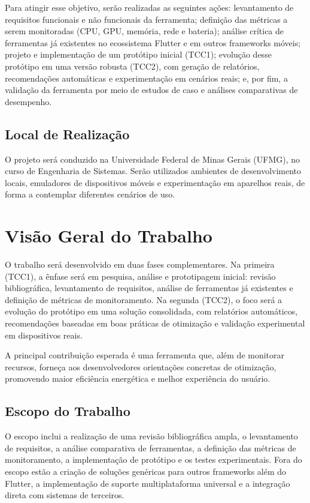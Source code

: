 \documentclass[12pt,a4paper]{article}
\begin{document}
Para atingir esse objetivo, serão realizadas as seguintes ações: levantamento de requisitos funcionais e não funcionais da ferramenta; definição das métricas a serem monitoradas (CPU, GPU, memória, rede e bateria); análise crítica de ferramentas já existentes no ecossistema Flutter e em outros frameworks móveis; projeto e implementação de um protótipo inicial (TCC1); evolução desse protótipo em uma versão robusta (TCC2), com geração de relatórios, recomendações automáticas e experimentação em cenários reais; e, por fim, a validação da ferramenta por meio de estudos de caso e análises comparativas de desempenho.

\subsection{Local de Realização}
O projeto será conduzido na Universidade Federal de Minas Gerais (UFMG), no curso de Engenharia de Sistemas. Serão utilizados ambientes de desenvolvimento locais, emuladores de dispositivos móveis e experimentação em aparelhos reais, de forma a contemplar diferentes cenários de uso.

\section{Visão Geral do Trabalho}

O trabalho será desenvolvido em duas fases complementares. Na primeira (TCC1), a ênfase será em pesquisa, análise e prototipagem inicial: revisão bibliográfica, levantamento de requisitos, análise de ferramentas já existentes e definição de métricas de monitoramento. Na segunda (TCC2), o foco será a evolução do protótipo em uma solução consolidada, com relatórios automáticos, recomendações baseadas em boas práticas de otimização e validação experimental em dispositivos reais.  

A principal contribuição esperada é uma ferramenta que, além de monitorar recursos, forneça aos desenvolvedores orientações concretas de otimização, promovendo maior eficiência energética e melhor experiência do usuário.

\subsection{Escopo do Trabalho}
O escopo inclui a realização de uma revisão bibliográfica ampla, o levantamento de requisitos, a análise comparativa de ferramentas, a definição das métricas de monitoramento, a implementação de protótipo e os testes experimentais. Fora do escopo estão a criação de soluções genéricas para outros frameworks além do Flutter, a implementação de suporte multiplataforma universal e a integração direta com sistemas de terceiros.  
\end{document}
